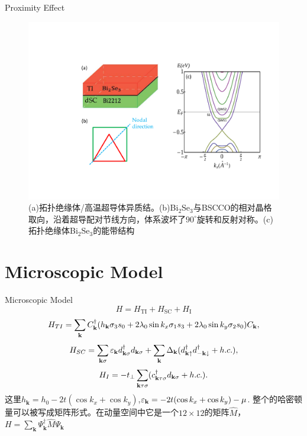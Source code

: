 \documentclass[10pt,aspectratio=169]{beamer} %
\begin{document}
\begin{frame}{Proximity Effect}
\begin{figure}[h]
\centering
\includegraphics[scale=0.48]{pic/fig15.pdf}
\caption{(a)拓扑绝缘体/高温超导体异质结。(b)Bi$_2$Se$_3$与BSCCO的相对晶格取向，沿着超导配对节线方向，体系波坏了$90^\circ$旋转和反射对称。(c)拓扑绝缘体Bi$_2$Se$_3$的能带结构}\label{fig14}
\end{figure}
\end{frame}
\section{Microscopic Model}
\begin{frame}{Microscopic Model}
\begin{equation}
H=H_\mathrm{TI}+H_\mathrm{SC}+H_\mathrm{I}\label{ham}
\end{equation}
\begin{equation}
\begin{aligned}
H_{TI} =\sum_{{\bf k}}C_{{\bf k}}^\dagger (h_\mathbf{k}\sigma_3s_0+2\lambda_{0}\sin k_x\sigma_1s_3+2\lambda_0\sin k_y\sigma_2 s_0)C_{{\bf k}},
\end{aligned}
\end{equation}
\begin{equation}
H_{SC}=\sum_{{\bf k}\sigma}\varepsilon_{\bf k}d^\dagger_{{\bf k}\sigma}d_{{\bf k}\sigma}+\sum_{{\bf k}}\Delta_{\bf k}(d^\dagger_{{\bf k}\uparrow}d^\dagger_{{-\bf k}\downarrow}+h.c.),
\end{equation}
\begin{equation}
H_{I}=-t_\perp \sum_{{\bf k}\tau\sigma}(c_{{\bf k}\tau\sigma}^\dagger d_{{\bf k}\sigma}+h.c.).
\end{equation}
这里$h_\mathbf{k}=h_0-2t(\cos k_x+\cos k_y)$,$\varepsilon_{\bf k}=-2t(\cos k_x+\cos k_y)-\mu$.
整个的哈密顿量可以被写成矩阵形式。在动量空间中它是一个$12\times 12$的矩阵$\hat{M}$，$H=\sum_{\mathbf{k}}\Psi_\mathbf{k}^\dagger\hat{M}\Psi_\mathbf{k}$
\end{frame}
\end{document}
